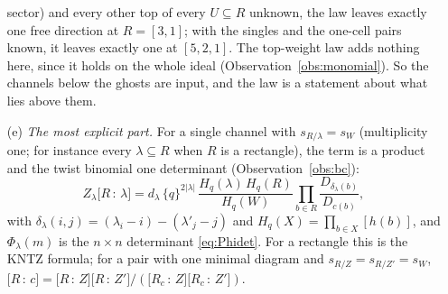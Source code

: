 \documentclass[11pt]{article}
\newcommand{\cf}[2]{\bigl[#1\,{:}\,#2\bigr]}
\begin{document}
\begin{itemize}
sector) and every other top of every $U\subseteq R$ unknown, the law leaves exactly one free direction at $R=[3,1]$; with the
singles and the one-cell pairs known, it leaves exactly one at $[5,2,1]$.  The top-weight law adds nothing here, since it
holds on the whole ideal (Observation~\ref{obs:monomial}).  So the channels below the ghosts are input, and the law is a
statement about what lies above them.
\item[(e)] \emph{The most explicit part.}  For a single channel with $s_{R/\lambda}=s_W$ (multiplicity one; for instance
every $\lambda\subseteq R$ when $R$ is a rectangle), the term is a product and the twist binomial one determinant
(Observation~\ref{obs:bc}):
\[
Z_\lambda\cf R\lambda=d_\lambda\,\{q\}^{2|\lambda|}\,\frac{H_q(\lambda)\,H_q(R)}{H_q(W)}
\prod_{b\in R}\frac{D_{\delta_\lambda(b)}}{D_{c(b)}},
\]
with $\delta_\lambda(i,j)=(\lambda_i-i)-(\lambda'_j-j)$ and $H_q(X)=\prod_{b\in X}[h(b)]$,
and $\Phi_\lambda(m)$ is the $n\times n$ determinant \eqref{eq:Phidet}.  For a rectangle this is the KNTZ formula; for a pair
with one minimal diagram and $s_{R/Z}=s_{R/Z'}=s_W$, $\cf Rc=\cf RZ\cf R{Z'}/(\cf{R_c}Z\cf{R_c}{Z'})$.
\end{itemize}
\end{document}

